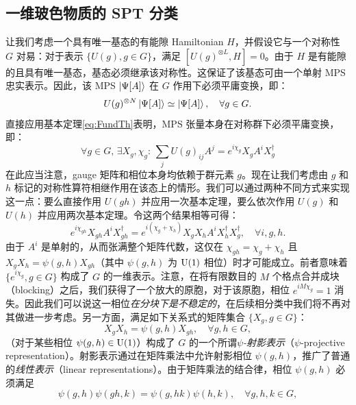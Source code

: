 \subsection{一维玻色物质的 SPT 分类}\label{sec:SPT1d}
让我们考虑一个具有唯一基态的有能隙 Hamiltonian $H$，并假设它与一个对称性 $G$ 对易：对于表示 $\{U(g),g\in G\}$，满足 $[U(g)^{\otimes L},H]=0$。由于 $H$ 是有能隙的且具有唯一基态，基态必须继承该对称性。这保证了该基态可由一个单射 MPS 忠实表示。因此，该 MPS $\ket{\Psi[A]}$ 在 $G$ 作用下必须平庸变换，即：
\begin{equation}
    U(g)^{\otimes N} \ket{\Psi[A]} \simeq \ket{\Psi[A]}, \quad \forall g \in G.
\end{equation}
直接应用基本定理\cref{eq:FundTh}表明，MPS 张量本身在对称群下必须平庸变换，即：
\begin{equation}\label{eq:gMPS}
    \forall g \in G,\, \exists X_g,\chi_g: \, \sum_j U(g)_{ij} A^j = e^{i\chi_g} X_gA^iX_g^\dagger
\end{equation}
在此应当注意，gauge 矩阵和相位本身均依赖于群元素 $g$。现在让我们考虑由 $g$ 和 $h$ 标记的对称性算符相继作用在该态上的情形。我们可以通过两种不同方式来实现这一点：要么直接作用 $U(gh)$ 并应用一次基本定理，要么依次作用 $U(g)$ 和 $U(h)$ 并应用两次基本定理。令这两个结果相等可得：
\begin{equation}
    e^{i\chi_{gh}}X_{gh} A^i X_{gh}^\dagger = e^{i(\chi_g+\chi_h)}X_gX_h A^i X_h^\dagger X_g^\dagger,\quad\forall i,g,h.
\end{equation}
由于 $A^i$ 是单射的，从而张满整个矩阵代数，这仅在 $\chi_{gh}=\chi_g +\allowbreak \chi_h$ 且 $ X_gX_h = \psi(g,h) X_{gh}$（其中 $\psi(g,h)$ 为 ${\rm U}(1)$ 相位）时才可能成立。前者意味着 $\{e^{i\chi_g},g\in G\}$ 构成了 $G$ 的一维表示。注意，在将有限数目的 $M$ 个格点合并成块（blocking）之后，我们获得了一个放大的原胞，对于该原胞，相位 $e^{iM\chi_g}=1$ 消失。因此我们可以说这一相位\emph{在分块下是不稳定的}，在后续相分类中我们将不再对其做进一步考虑。另一方面，满足如下关系式的矩阵集合 $\{X_g,g\in G\}$：
\begin{equation}\label{eq:ProjRep}
    X_gX_h = \psi(g,h) X_{gh}, \quad \forall g,h\in G,
\end{equation}
（对于某些相位 $\psi(g,h)\in{\rm U}(1)$）构成了 $G$ 的一个所谓\emph{$\psi$-射影表示}（$\psi$-projective representation）。射影表示通过在矩阵乘法中允许射影相位 $\psi(g,h)$，推广了普通的\emph{线性表示}（linear representations）。由于矩阵乘法的结合律，相位 $\psi(g,h)$ 必须满足
\begin{equation}\label{eq:2cocycle}
    \psi(g,h)\psi(gh,k) = \psi(g,hk)\psi(h,k), \quad \forall g,h,k\in G,
\end{equation}
